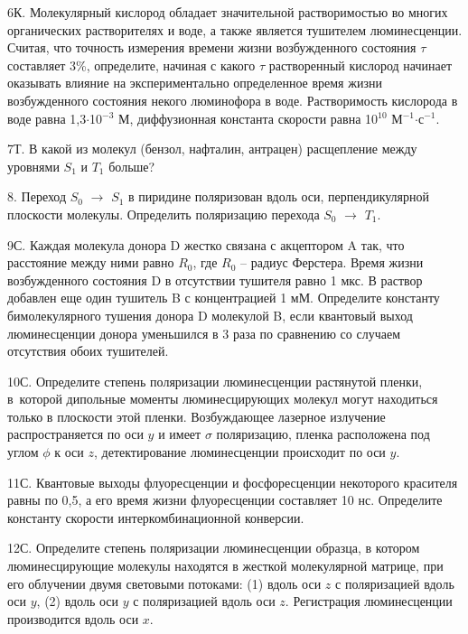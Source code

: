 6К. Молекулярный кислород обладает значительной растворимостью во многих органических растворителях и воде, а также является тушителем люминесценции. Считая, что точность измерения времени жизни возбужденного состояния $\tau$ составляет 3\%, определите, начиная с какого $\tau$ растворенный кислород начинает оказывать влияние на экспериментально определенное время жизни возбужденного состояния некого люминофора в воде. Растворимость кислорода в воде равна 1,3$\cdot$10$^{-3}$ М, диффузионная константа скорости равна 10$^{10}$ М$^{-1}$$\cdot$с$^{-1}$.
\par
7Т. В какой из молекул (бензол, нафталин, антрацен) расщепление между уровнями $S_1$ и $T_1$ больше?
\par
8. Переход $S_0$ $\rightarrow$ $S_1$ в пиридине поляризован вдоль оси, перпендикулярной плоскости молекулы. Определить поляризацию перехода $S_0$ $\rightarrow$ $T_1$.
\par
9С. Каждая молекула донора D жестко связана с акцептором A так, что расстояние между ними равно $R_0$, где $R_0$ – радиус Ферстера. Время жизни возбужденного состояния D в отсутствии тушителя равно 1 мкс. В раствор добавлен еще один тушитель B с концентрацией 1 мМ. Определите константу бимолекулярного тушения донора D молекулой B, если квантовый выход люминесценции донора уменьшился в 3 раза по сравнению со случаем отсутствия обоих тушителей.
\par
10С. Определите степень поляризации люминесценции растянутой пленки, в~которой дипольные моменты люминесцирующих молекул могут находиться только в плоскости этой пленки. Возбуждающее лазерное излучение распространяется по оси $y$ и имеет $\sigma$ поляризацию, пленка расположена под углом $\phi$ к оси $z$, детектирование люминесценции происходит по оси $y$.
\par
11С. Квантовые выходы флуоресценции и фосфоресценции некоторого красителя равны по 0,5, а его время жизни флуоресценции составляет 10 нс. Определите константу скорости интеркомбинационной конверсии.
\par
12С. Определите степень поляризации люминесценции образца, в котором люминесцирующие молекулы находятся в жесткой молекулярной матрице, при его облучении двумя световыми потоками: (1) вдоль оси $z$ с поляризацией вдоль оси $y$, (2) вдоль оси $y$ с поляризацией вдоль оси $z$. Регистрация люминесценции производится вдоль оси $x$.
\par
\begin{figure} %
    \centering
    \vspace{0mm}

\end{figure}$$
